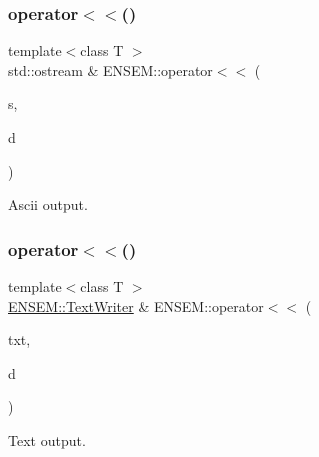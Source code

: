 \subsubsection{\texorpdfstring{operator$<$$<$()}{operator<<()}\hspace{0.1cm}{\footnotesize\ttfamily [1/4]}}
{\footnotesize\ttfamily template$<$class T $>$ \\
std\+::ostream \& E\+N\+S\+E\+M\+::operator$<$$<$ (\begin{DoxyParamCaption}\item[{std\+::ostream \&}]{s,  }\item[{const \mbox{\hyperlink{classENSEM_1_1RScalar}{R\+Scalar}}$<$ T $>$ \&}]{d }\end{DoxyParamCaption})\hspace{0.3cm}{\ttfamily [inline]}}



Ascii output. 

\mbox{\label{group__rscalar_ga1b0ef216d273bb97e82fce8f99467105}} 
\subsubsection{\texorpdfstring{operator$<$$<$()}{operator<<()}\hspace{0.1cm}{\footnotesize\ttfamily [2/4]}}
{\footnotesize\ttfamily template$<$class T $>$ \\
\mbox{\hyperlink{classENSEM_1_1TextWriter}{E\+N\+S\+E\+M\+::\+Text\+Writer}} \& E\+N\+S\+E\+M\+::operator$<$$<$ (\begin{DoxyParamCaption}\item[{\mbox{\hyperlink{classENSEM_1_1TextWriter}{E\+N\+S\+E\+M\+::\+Text\+Writer}} \&}]{txt,  }\item[{const \mbox{\hyperlink{classENSEM_1_1RScalar}{R\+Scalar}}$<$ T $>$ \&}]{d }\end{DoxyParamCaption})\hspace{0.3cm}{\ttfamily [inline]}}



Text output. 

\mbox{\label{group__rscalar_ga73069f4953b3397b5fbd94f9b78203fa}} 
